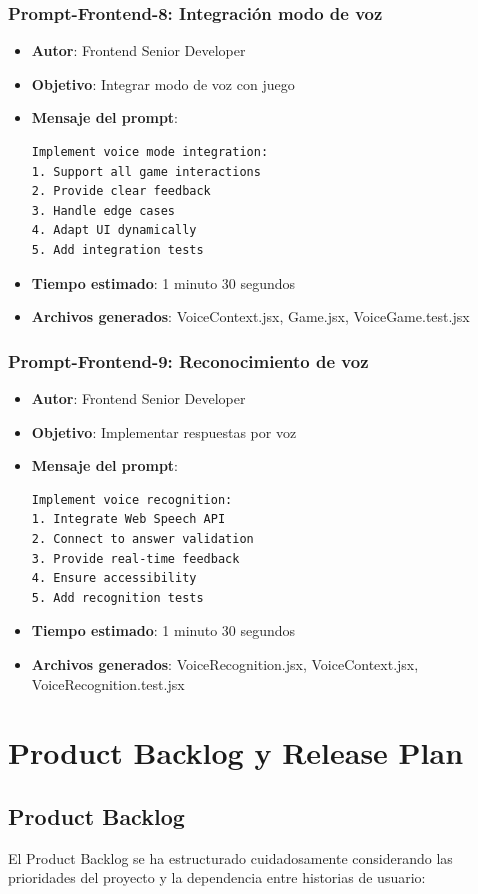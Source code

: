 \documentclass[12pt]{article}
\begin{document}
\subsubsection{Prompt-Frontend-8: Integración modo de voz}
\begin{itemize}
    \item \textbf{Autor}: Frontend Senior Developer
    \item \textbf{Objetivo}: Integrar modo de voz con juego
    \item \textbf{Mensaje del prompt}:
    \begin{verbatim}
Implement voice mode integration:
1. Support all game interactions
2. Provide clear feedback
3. Handle edge cases
4. Adapt UI dynamically
5. Add integration tests
    \end{verbatim}
    \item \textbf{Tiempo estimado}: 1 minuto 30 segundos
    \item \textbf{Archivos generados}: VoiceContext.jsx, Game.jsx, VoiceGame.test.jsx
\end{itemize}

\subsubsection{Prompt-Frontend-9: Reconocimiento de voz}
\begin{itemize}
    \item \textbf{Autor}: Frontend Senior Developer
    \item \textbf{Objetivo}: Implementar respuestas por voz
    \item \textbf{Mensaje del prompt}:
    \begin{verbatim}
Implement voice recognition:
1. Integrate Web Speech API
2. Connect to answer validation
3. Provide real-time feedback
4. Ensure accessibility
5. Add recognition tests
    \end{verbatim}
    \item \textbf{Tiempo estimado}: 1 minuto 30 segundos
    \item \textbf{Archivos generados}: VoiceRecognition.jsx, VoiceContext.jsx, VoiceRecognition.test.jsx
\end{itemize}


\section{Product Backlog y Release Plan}

\subsection{Product Backlog}
El Product Backlog se ha estructurado cuidadosamente considerando las prioridades del proyecto y la dependencia entre historias de usuario:
\end{document}
